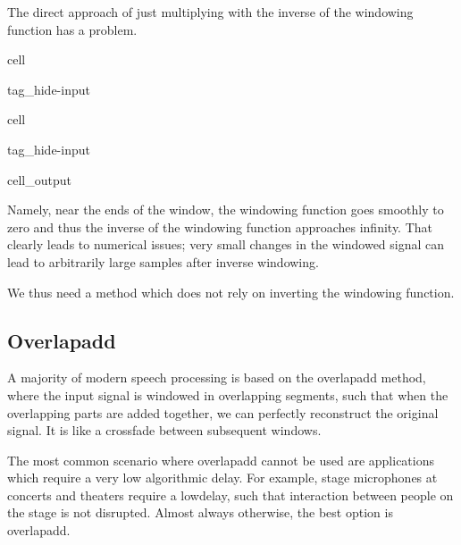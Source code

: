 \documentclass[letterpaper,10pt,english]{jupyterBook}
\begin{document}
\sphinxAtStartPar
The direct approach of just multiplying with the inverse of the windowing function has a problem.

\begin{sphinxuseclass}{cell}
\begin{sphinxuseclass}{tag_hide-input}
\end{sphinxuseclass}
\end{sphinxuseclass}
\begin{sphinxuseclass}{cell}
\begin{sphinxuseclass}{tag_hide-input}\begin{sphinxVerbatimOutput}

\begin{sphinxuseclass}{cell_output}
\noindent{}

\end{sphinxuseclass}\end{sphinxVerbatimOutput}

\end{sphinxuseclass}
\end{sphinxuseclass}
\sphinxAtStartPar
Namely, near the ends of the window, the windowing function goes smoothly to zero and thus the inverse of the windowing function approaches infinity. That clearly leads to numerical issues; very small changes in the windowed signal can lead to arbitrarily large samples after inverse windowing.

\sphinxAtStartPar
We thus need a method which does not rely on inverting the windowing function.


\subsection{Overlap\sphinxhyphen{}add}
\label{\detokenize{Representations/Short-time_processing:overlap-add}}
\sphinxAtStartPar
A majority of modern speech processing is based on the overlap\sphinxhyphen{}add method, where the input signal is windowed in overlapping segments, such that when the overlapping parts are added together, we can perfectly reconstruct the original signal. It is like a cross\sphinxhyphen{}fade between subsequent windows.

\sphinxAtStartPar
The most common scenario where overlap\sphinxhyphen{}add cannot be used are applications which require a very low algorithmic delay. For example, stage microphones at concerts and theaters require a low\sphinxhyphen{}delay, such that interaction between people on the stage is not disrupted. Almost always otherwise, the best option is overlap\sphinxhyphen{}add.
\end{document}
